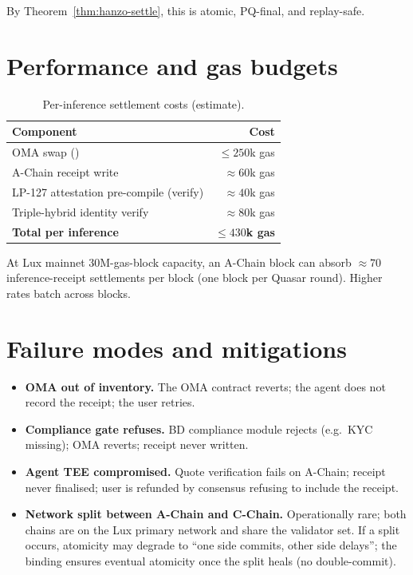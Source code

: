 \documentclass[11pt]{article}
\begin{document}
By Theorem~\ref{thm:hanzo-settle}, this is atomic, PQ-final, and
replay-safe.

\section{Performance and gas budgets}
\label{sec:perf}

\begin{table}[h]
\centering
\caption{Per-inference settlement costs (estimate).}
\begin{tabular}{lr}
\toprule
Component & Cost \\
\midrule
OMA swap ()            & $\leq 250$k gas \\
A-Chain receipt write                     & $\approx 60$k gas \\
LP-127 attestation pre-compile (verify)   & $\approx 40$k gas \\
Triple-hybrid identity verify             & $\approx 80$k gas \\
\midrule
\textbf{Total per inference}              & \textbf{$\leq 430$k gas} \\
\bottomrule
\end{tabular}
\end{table}

At Lux mainnet 30M-gas-block capacity, an A-Chain block can absorb
$\approx 70$ inference-receipt settlements per block (one block per
Quasar round). Higher rates batch across blocks.

\section{Failure modes and mitigations}
\label{sec:failure}

\begin{itemize}[nosep]
  \item \textbf{OMA out of inventory.} The OMA contract reverts; the
        agent does not record the receipt; the user retries.
  \item \textbf{Compliance gate refuses.} BD compliance module
        rejects (e.g.\ KYC missing); OMA reverts; receipt never
        written.
  \item \textbf{Agent TEE compromised.} Quote verification fails on
        A-Chain; receipt never finalised; user is refunded by
        consensus refusing to include the receipt.
  \item \textbf{Network split between A-Chain and C-Chain.}
        Operationally rare; both chains are on the Lux primary
        network and share the validator set. If a split occurs,
        atomicity may degrade to ``one side commits, other side
        delays''; the binding ensures eventual atomicity once the
        split heals (no double-commit).
\end{itemize}
\end{document}
